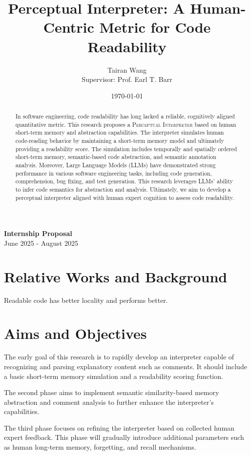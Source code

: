 \documentclass{article}
\title{Perceptual Interpreter: A Human-Centric Metric for Code Readability}
\author{Tairan Wang \\ Supervisor: Prof. Earl T. Barr}
\date{\today}
\begin{document}
\maketitle

\begin{center}
    \textbf{Internship Proposal} \\
    June 2025 - August 2025
\end{center}

\begin{abstract}
    In software engineering, code readability has long lacked a reliable, cognitively aligned quantitative metric. This research proposes a \textsc{Perceptual Interpreter} based on human short-term memory and abstraction capabilities. The interpreter simulates human code-reading behavior by maintaining a short-term memory model and ultimately providing a readability score. The simulation includes temporally and spatially ordered short-term memory, semantic-based code abstraction, and semantic annotation analysis. Moreover, Large Language Models (LLMs) have demonstrated strong performance in various software engineering tasks, including code generation, comprehension, bug fixing, and test generation. This research leverages LLMs' ability to infer code semantics for abstraction and analysis. Ultimately, we aim to develop a perceptual interpreter aligned with human expert cognition to assess code readability.
\end{abstract}

\section*{Relative Works and Background}
Readable code has better locality and performs better.

\section*{Aims and Objectives}

The early goal of this research is to rapidly develop an interpreter capable of recognizing and parsing explanatory content such as comments. It should include a basic short-term memory simulation and a readability scoring function.

The second phase aims to implement semantic similarity-based memory abstraction and comment analysis to further enhance the interpreter's capabilities.

The third phase focuses on refining the interpreter based on collected human expert feedback. This phase will gradually introduce additional parameters such as human long-term memory, forgetting, and recall mechanisms.
\end{document}
